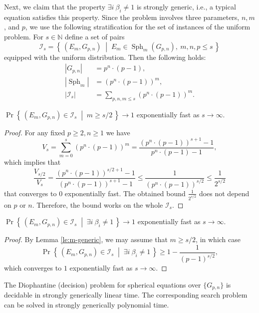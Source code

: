 \documentclass{jgcc}
\def\CI{{\mathcal I}}
\newcommand{\Set}[2]{\left\{\, #1 \;\middle|\; #2 \,\right\}}%
\def\MN{{\mathbb{N}}}
\DeclareMathOperator{\Sph}{Sph}
\begin{document}
Next, we claim that the property 
$\exists i\ \beta_i\ne 1$ is strongly generic, 
i.e., a typical equation satisfies this property.
Since the problem involves three parameters, $n,m$, and $p$, we use the following 
stratification for the set of instances of the uniform problem. For $s\in\MN$ 
define a set of pairs
$$
\CI_s = \Set{(E_m,G_{p,n})}{E_m\in \Sph_m(G_{p,n}),\ m,n,p\le s}
$$
equipped with the uniform distribution.
Then the following holds:
\begin{align*}
|G_{p,n}| &= p^n\cdot (p-1),\\
|\Sph_m| &= (p^n\cdot (p-1))^m,\\
|\CI_s| &= \sum_{p,n,m\le s} (p^n\cdot (p-1))^m.
\end{align*}

\begin{lem}\label{le:m-generic}
$\Pr\Set{(E_m,G_{p,n})\in \CI_s}{m\ge s/2} \to 1$ 
exponentially fast as $s\to\infty$.
\end{lem}

\begin{proof}
For any fixed $p\ge 2,n\ge 1$ we have
$$
V_s=\sum_{m=0}^s 
(p^n\cdot (p-1))^m 
= \frac{(p^n\cdot (p-1))^{s+1}-1}{p^n\cdot (p-1)-1},
$$
which implies that
$$
\frac{V_{s/2}}{V_s} = 
\frac{(p^n\cdot (p-1))^{s/2+1}-1}{(p^n\cdot (p-1))^{s+1}-1}
\le
\frac{1}{(p^n\cdot (p-1))^{s/2}} 
\le
\frac{1}{2^{s/2}} 
$$
that converges to $0$ exponentially fast. The obtained bound
$\frac{1}{2^{s/2}}$ does not depend on $p$ or $n$.
Therefore, the bound works on the whole $\CI_s$.
\end{proof}

\begin{lem}\label{le:beta-generic}
$\Pr\Set{(E_m,G_{p,n})\in \CI_s}{\exists i\ \beta_i\ne 1} \to 1$ 
exponentially fast as $s\to\infty$.
\end{lem}

\begin{proof}
By Lemma \ref{le:m-generic}, we may assume that $m\ge s/2$, in which case 
$$
\Pr\Set{(E_m,G_{p,n})\in \CI_s}{\exists i\ \beta_i\ne 1} \ge 1-\frac{1}{(p-1)^{s/2}},
$$ 
which converges to $1$ exponentially fast as $s\to\infty$.
\end{proof}

\begin{cor}
The Diophantine (decision) problem for spherical equations over $\{G_{p,n}\}$
is decidable in strongly generically linear time. 
The corresponding search problem can be solved in
strongly generically polynomial time. 
\end{cor}
\end{document}
